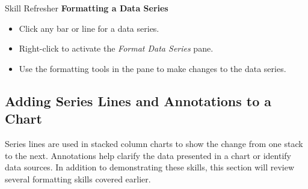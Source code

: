 \begin{center}
	\begin{sklbox}{Skill Refresher}
		\textbf{Formatting a Data Series}
		\\
		\begin{itemize}
			\setlength{\itemsep}{0pt}
			\setlength{\parskip}{0pt}
			\setlength{\parsep}{0pt}
			
			\item Click any bar or line for a data series.
			\item Right-click to activate the \textit{Format Data Series} pane.
			\item Use the formatting tools in the pane to make changes to the data series.
			
		\end{itemize}
	\end{sklbox}
\end{center}

\subsection{Adding Series Lines and Annotations to a Chart}

Series lines are used in stacked column charts to show the change from one stack to the next. Annotations help clarify the data presented in a chart or identify data sources. In addition to demonstrating these skills, this section will review several formatting skills covered earlier. 

